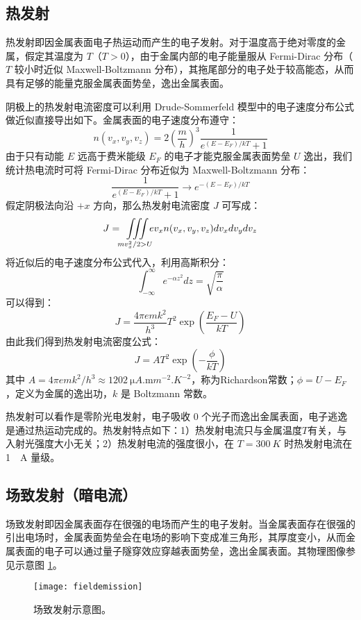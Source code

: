 \subsection{热发射}
热发射即因金属表面电子热运动而产生的电子发射。对于温度高于绝对零度的金属，假定其温度为 $T$（$T > 0$），由于金属内部的电子能量服从 Fermi-Dirac 分布（$T$ 较小时近似 Maxwell-Boltzmann 分布），其拖尾部分的电子处于较高能态，从而具有足够的能量克服金属表面势垒，逸出金属表面\cite{richardson1901negative}。

阴极上的热发射电流密度可以利用 Drude-Sommerfeld 模型中的电子速度分布公式做近似直接导出如下。金属表面的电子速度分布遵守：
	\[n(v_x, v_y, v_z) = 2\left(\frac{m}{h}\right)^3\frac{1}{e^{(E-E_F)/kT}+1}\]
	由于只有动能 $E$ 远高于费米能级 $E_F$ 的电子才能克服金属表面势垒 $U$ 逸出，我们统计热电流时可将 Fermi-Dirac 分布近似为 Maxwell-Boltzmann 分布：
	\[\frac{1}{e^{(E-E_F)/kT}+1} \rightarrow e^{-(E-E_F)/kT}\]
	假定阴极法向沿 $+x$ 方向，那么热发射电流密度 $J$ 可写成：
	\[J = \iiint\limits_{mv_x^2/2 > U}\!\!\! ev_xn(v_x, v_y, v_z)dv_xdv_ydv_z\]
	将近似后的电子速度分布公式代入，利用高斯积分：
	\[\int_{-\infty}^{\infty}e^{-\alpha z^2}dz=\sqrt{\frac{\pi}{\alpha}}\]
	可以得到：
	\[J = \frac{4\pi emk^2}{h^3}T^2\exp\left(\frac{E_F-U}{kT}\right)\]
	由此我们得到热发射电流密度公式：
\begin{equation}
	J = AT^2\exp\left(-\frac{\phi}{kT}\right)
\end{equation}
	其中 $A=4\pi emk^2/h^3\approx \SI{1202}{\micro A.\milli m^{-2}.K^{-2}}$，称为Richardson常数；$\phi=U-E_F$，定义为金属的逸出功，$k$ 是 Boltzmann 常数。

热发射可以看作是零阶光电发射，电子吸收 0 个光子而逸出金属表面，电子逃逸是通过热运动完成的。热发射特点如下：1）热发射电流只与金属温度$T$有关，与入射光强度大小无关；2）热发射电流的强度很小，在 $T = \SI{300}{K}$ 时热发射电流在 \SI{1}{\mu A} 量级。

\subsection{场致发射（暗电流）}
场致发射即因金属表面存在很强的电场而产生的电子发射。当金属表面存在很强的引出电场时，金属表面势垒会在电场的影响下变成准三角形，其厚度变小，从而金属表面的电子可以通过量子隧穿效应穿越表面势垒，逸出金属表面。其物理图像参见示意图 \ref{fig:fieldemission}。
\begin{figure}[htbp]
\centering
\texttt{[image: fieldemission]}
\caption{\label{fig:fieldemission} 场致发射示意图\cite{nordheim1928effect}。}
\end{figure}

